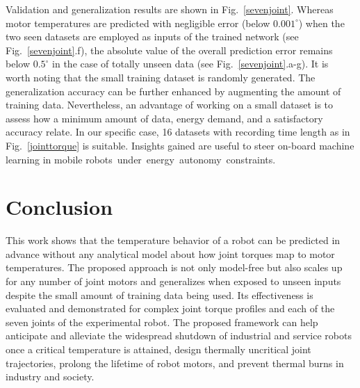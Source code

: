 \documentclass{ifacconf}
\begin{document}
Validation and generalization results are shown in Fig.~\ref{sevenjoint}. Whereas motor temperatures are predicted with negligible error (below $0.001^\circ$) when the two seen  datasets are employed as inputs of the trained network (see Fig.~\ref{sevenjoint}.f), the absolute value of the overall prediction error remains below $0.5^\circ$ in the case of totally unseen data (see  Fig.~\ref{sevenjoint}.a-g). It is worth noting that the small training dataset is randomly generated. The generalization accuracy can be further enhanced by augmenting the amount of training data. Nevertheless, an advantage of working on a small dataset is to assess how a minimum amount of data, energy demand, and a satisfactory accuracy relate. In our specific case, 16 datasets with recording time length as in Fig.~\ref{jointtorque} is suitable. Insights gained are useful to steer on-board machine learning in  mobile \mbox{robots under energy autonomy constraints.}








\section{Conclusion}
This work shows that the temperature behavior of a robot can be predicted in advance without any analytical  model about how joint torques map to motor temperatures. The proposed approach is not only model-free but also scales up for any number of joint motors and generalizes when exposed to  unseen inputs despite the small amount of training data being used. Its effectiveness is evaluated and demonstrated for complex joint torque profiles and  each of the seven joints of the experimental robot. The proposed framework can help anticipate and alleviate the widespread shutdown  of industrial and service robots once a critical temperature  is attained, design thermally uncritical joint trajectories, prolong the lifetime of robot motors, and prevent thermal burns in industry and society.


                                                   
\end{document}
